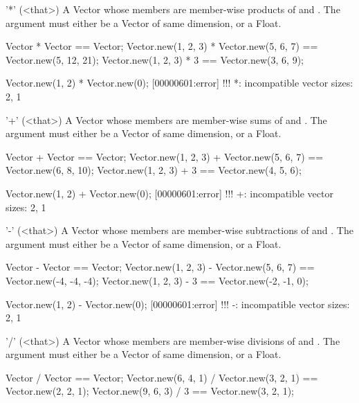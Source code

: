 \begin{urbiscriptapi}
\item['*'](<that>)%
  A Vector whose members are member-wise products of \this and \that.  The
  argument \that must either be a Vector of same dimension, or a Float.
\begin{urbiassert}
Vector              * Vector              == Vector;
Vector.new(1, 2, 3) * Vector.new(5, 6, 7) == Vector.new(5, 12, 21);
Vector.new(1, 2, 3) * 3                   == Vector.new(3,  6,  9);

Vector.new(1, 2) * Vector.new(0);
[00000601:error] !!! *: incompatible vector sizes: 2, 1
\end{urbiassert}


\item['+'](<that>)%
  A Vector whose members are member-wise sums of \this and \that.  The
  argument \that must either be a Vector of same dimension, or a Float.
\begin{urbiassert}
Vector              + Vector              == Vector;
Vector.new(1, 2, 3) + Vector.new(5, 6, 7) == Vector.new(6, 8, 10);
Vector.new(1, 2, 3) + 3                   == Vector.new(4, 5,  6);

Vector.new(1, 2) + Vector.new(0);
[00000601:error] !!! +: incompatible vector sizes: 2, 1
\end{urbiassert}


\item['-'](<that>)%
  A Vector whose members are member-wise subtractions of \this and \that.
  The argument \that must either be a Vector of same dimension, or a Float.
\begin{urbiassert}
Vector              - Vector              == Vector;
Vector.new(1, 2, 3) - Vector.new(5, 6, 7) == Vector.new(-4, -4, -4);
Vector.new(1, 2, 3) - 3                   == Vector.new(-2, -1,  0);

Vector.new(1, 2) - Vector.new(0);
[00000601:error] !!! -: incompatible vector sizes: 2, 1
\end{urbiassert}


\item['/'](<that>)%
  A Vector whose members are member-wise divisions of \this and \that.  The
  argument \that must either be a Vector of same dimension, or a Float.
\begin{urbiassert}
Vector              / Vector              == Vector;
Vector.new(6, 4, 1) / Vector.new(3, 2, 1) == Vector.new(2, 2, 1);
Vector.new(9, 6, 3) / 3                   == Vector.new(3, 2, 1);


\end{urbiassert}
\end{urbiscriptapi}
